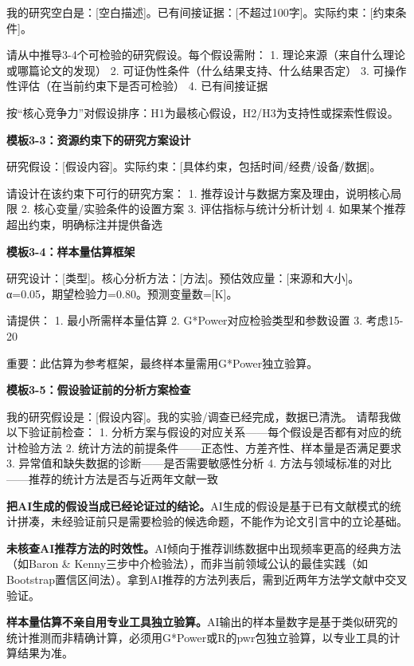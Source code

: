 \begin{tcolorbox}[promptbox]
我的研究空白是：[空白描述]。已有间接证据：[不超过100字]。实际约束：[约束条件]。

请从中推导3-4个可检验的研究假设。每个假设需附：
1. 理论来源（来自什么理论或哪篇论文的发现）
2. 可证伪性条件（什么结果支持、什么结果否定）
3. 可操作性评估（在当前约束下是否可检验）
4. 已有间接证据

按``核心竞争力''对假设排序：H1为最核心假设，H2/H3为支持性或探索性假设。
\end{tcolorbox}

\textbf{模板3-3：资源约束下的研究方案设计}

\begin{tcolorbox}[promptbox]
研究假设：[假设内容]。实际约束：[具体约束，包括时间/经费/设备/数据]。

请设计在该约束下可行的研究方案：
1. 推荐设计与数据方案及理由，说明核心局限
2. 核心变量/实验条件的设置方案
3. 评估指标与统计分析计划
4. 如果某个推荐超出约束，明确标注并提供备选
\end{tcolorbox}

\textbf{模板3-4：样本量估算框架}

\begin{tcolorbox}[promptbox]
研究设计：[类型]。核心分析方法：[方法]。预估效应量：[来源和大小]。
α=0.05，期望检验力=0.80。预测变量数=[K]。

请提供：
1. 最小所需样本量估算
2. G*Power对应检验类型和参数设置
3. 考虑15-20%

重要：此估算为参考框架，最终样本量需用G*Power独立验算。
\end{tcolorbox}

\textbf{模板3-5：假设验证前的分析方案检查}

\begin{tcolorbox}[promptbox]
我的研究假设是：[假设内容]。我的实验/调查已经完成，数据已清洗。
请帮我做以下验证前检查：
1. 分析方案与假设的对应关系——每个假设是否都有对应的统计检验方法
2. 统计方法的前提条件——正态性、方差齐性、样本量是否满足要求
3. 异常值和缺失数据的诊断——是否需要敏感性分析
4. 方法与领域标准的对比——推荐的统计方法是否与近两年文献一致
\end{tcolorbox}



\begin{mistakebox}

\textbf{把AI生成的假设当成已经论证过的结论。}AI生成的假设是基于已有文献模式的统计拼凑，未经验证前只是需要检验的候选命题，不能作为论文引言中的立论基础。

\smallskip

\textbf{未核查AI推荐方法的时效性。}AI倾向于推荐训练数据中出现频率更高的经典方法（如Baron \& Kenny三步中介检验法），而非当前领域公认的最佳实践（如Bootstrap置信区间法）。拿到AI推荐的方法列表后，需到近两年方法学文献中交叉验证。

\smallskip

\textbf{样本量估算不亲自用专业工具独立验算。}AI输出的样本量数字是基于类似研究的统计推测而非精确计算，必须用G*Power或R的pwr包独立验算，以专业工具的计算结果为准。

\end{mistakebox}


